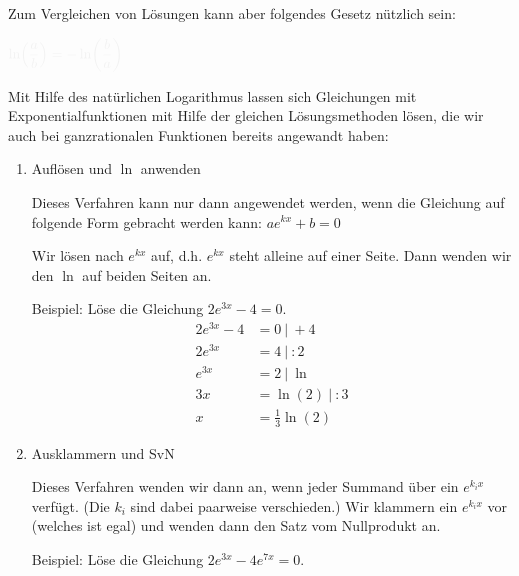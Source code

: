 Zum Vergleichen von Lösungen kann aber folgendes Gesetz nützlich sein:
\begin{tcolorbox}\centering
	\(\textcolor{loestc}{\ln\left(\dfrac{a}{b}\right)=-\ln\left(\dfrac{b}{a}\right)}\)
\end{tcolorbox}
Mit Hilfe des natürlichen Logarithmus lassen sich Gleichungen mit Exponentialfunktionen mit Hilfe der gleichen Lösungsmethoden lösen, die wir auch bei ganzrationalen Funktionen bereits angewandt haben:
\begin{enumerate}[label=\arabic*)]
	\item Auflösen und \(\ln\) anwenden

	Dieses Verfahren kann nur dann angewendet werden, wenn die Gleichung auf folgende Form gebracht werden kann: \(ae^{kx}+b=0\)

	Wir lösen nach \(e^{kx}\) auf, d.h. \(e^{kx}\) steht alleine auf einer Seite. Dann wenden wir den \(\ln\) auf beiden Seiten an.

	Beispiel: Löse die Gleichung \(2e^{3x}-4=0\).
	\textcolor{loes}{\begin{align*}
			2e^{3x}-4&=0\ \vert\ +4\\
			2e^{3x}&=4\ \vert\ :2\\
			e^{3x}&=2\ \vert\ \ln\\
			3x&=\ln\left(2\right)\ \vert\ :3\\
			x&=\frac{1}{3}\ln\left(2\right)
	\end{align*}}
	\item Ausklammern und SvN

	Dieses Verfahren wenden wir dann an, wenn jeder Summand über ein \(e^{k_ix}\) verfügt. (Die \(k_i\) sind dabei paarweise verschieden.) Wir klammern ein \(e^{k_ix}\) vor (welches ist egal) und wenden dann den Satz vom Nullprodukt an.

	Beispiel: Löse die Gleichung \(2e^{3x}-4e^{7x}=0\).
\end{enumerate}

\medskip

